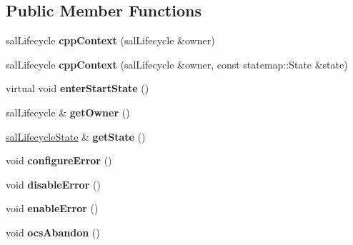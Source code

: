 \subsection*{Public Member Functions}
\begin{DoxyCompactItemize}
\item 
\hypertarget{classcpp_context_adafe7a058dd5d2ae9aa4bb6fc0063a15}{sal\-Lifecycle {\bfseries cpp\-Context} (sal\-Lifecycle \&owner)}\label{classcpp_context_adafe7a058dd5d2ae9aa4bb6fc0063a15}

\item 
\hypertarget{classcpp_context_a75ccf2f8927f03c4bd6df6dda5d575b5}{sal\-Lifecycle {\bfseries cpp\-Context} (sal\-Lifecycle \&owner, const statemap\-::\-State \&state)}\label{classcpp_context_a75ccf2f8927f03c4bd6df6dda5d575b5}

\item 
\hypertarget{classcpp_context_a06ec75da099c8bedbd5f589af33c3c9b}{virtual void {\bfseries enter\-Start\-State} ()}\label{classcpp_context_a06ec75da099c8bedbd5f589af33c3c9b}

\item 
\hypertarget{classcpp_context_a7ede22c753aff55534ba826607c1798e}{sal\-Lifecycle \& {\bfseries get\-Owner} ()}\label{classcpp_context_a7ede22c753aff55534ba826607c1798e}

\item 
\hypertarget{classcpp_context_a0e71bb4ab685eb3c6dd458002868f597}{\hyperlink{classsal_lifecycle_state}{sal\-Lifecycle\-State} \& {\bfseries get\-State} ()}\label{classcpp_context_a0e71bb4ab685eb3c6dd458002868f597}

\item 
\hypertarget{classcpp_context_aeb607d9b38a25a3daa8eafb87e82cb4a}{void {\bfseries configure\-Error} ()}\label{classcpp_context_aeb607d9b38a25a3daa8eafb87e82cb4a}

\item 
\hypertarget{classcpp_context_a9c9c0be4dec42f871242fd771405361c}{void {\bfseries disable\-Error} ()}\label{classcpp_context_a9c9c0be4dec42f871242fd771405361c}

\item 
\hypertarget{classcpp_context_af7dde283edb71ea2d174f3ae23a2efa5}{void {\bfseries enable\-Error} ()}\label{classcpp_context_af7dde283edb71ea2d174f3ae23a2efa5}

\item 
\hypertarget{classcpp_context_a3b15ef5e3f636e72e00ad1ee415df3d8}{void {\bfseries ocs\-Abandon} ()}\label{classcpp_context_a3b15ef5e3f636e72e00ad1ee415df3d8}


\end{DoxyCompactItemize}
